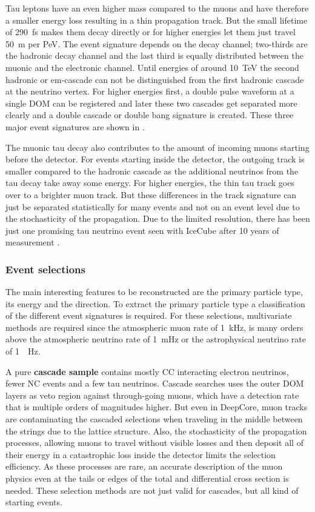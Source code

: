 Tau leptons have an even higher mass compared to the muons and have therefore a smaller energy loss resulting in a thin propagation track.
But the small lifetime of \SI{290}{fs} makes them decay directly or for higher energies let them just travel \SI{50}{m} per PeV.
The event signature depends on the decay channel; two-thirds are the hadronic decay channel and the last third is equally distributed between the muonic and the electronic channel.
Until energies of around \SI{10}{TeV} the second hadronic or em-cascade can not be distinguished from the first hadronic cascade at the neutrino vertex.
For higher energies first, a double pulse waveform at a single DOM can be registered and later these two cascades get separated more clearly and a double cascade or double bang signature is created.
These three major event signatures are shown in .

The muonic tau decay also contributes to the amount of incoming muons starting before the detector.
For events starting inside the detector, the outgoing track is smaller compared to the hadronic cascade as the additional neutrinos from the tau decay take away some energy.
For higher energies, the thin tau track goes over to a brighter muon track.
But these differences in the track signature can just be separated statistically for many events and not on an event level due to the stochasticity of the propagation.
Due to the limited resolution, there has been just one promising tau neutrino event seen with IceCube after 10 years of measurement \cite{Meier19ICRC, IceCube20HeseTau}.

\subsubsection{Event selections}

The main interesting features to be reconstructed are the primary particle type, its energy and the direction.
To extract the primary particle type a classification of the different event signatures is required.
For these selections, multivariate methods are required since the atmospheric muon rate of \SI{1}{kHz}, is many orders above the atmospheric neutrino rate of \SI{1}{mHz} or the astrophysical neutrino rate of \SI{1}{\micro.Hz}.

A pure \textbf{cascade sample} contains mostly CC interacting electron neutrinos, fewer NC events and a few tau neutrinos.
Cascade searches \cite{IceCube20Cascades} uses the outer DOM layers as veto region against through-going muons, which have a detection rate that is multiple orders of magnitudes higher.
But even in DeepCore, muon tracks are contaminating the cascaded selections when traveling in the middle between the strings due to the lattice structure.
Also, the stochasticity of the propagation processes, allowing muons to travel without visible losses and then deposit all of their energy in a catastrophic loss inside the detector limits the selection efficiency.
As these processes are rare, an accurate description of the muon physics even at the tails or edges of the total and differential cross section is needed.
These selection methods are not just valid for cascades, but all kind of starting events.

